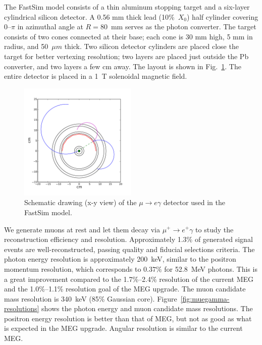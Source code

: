 The FastSim model consists of a thin aluminum stopping target and a six-layer
cylindrical silicon detector. A 0.56 mm thick lead (10\%~$X_0$) half cylinder
covering 0--$\pi$ in azimuthal angle at $R=80$~mm serves as the photon converter. 
The target consists of two cones connected at their base; each cone is 30 mm 
high, 5 mm in radius, and 50~$\mu m$ thick.
Two silicon detector cylinders are placed close the target for better vertexing resolution;
two layers are placed just outside the Pb converter, and two layers a few cm away. The layout is shown in
Fig.~\ref{fig:muegamma-scheme}. The entire detector is placed in a 1~T
solenoidal magnetic field. 

\begin{figure}[htbp]
   \centering
   \includegraphics[width=0.5\textwidth]{ChargedLeptons/Figures/muegamma-schematic.pdf} 
   \caption{Schematic drawing (x-y view) of the $\mu\to e\gamma$ detector used in the 
   FastSim model. }
   \label{fig:muegamma-scheme}
\end{figure}

We generate muons at rest and let them decay via $\mu^+\to e^+\gamma$ to study
the reconstruction efficiency and resolution. Approximately 1.3\% of generated
signal events are well-reconstructed, passing quality and fiducial selections criteria.
The photon energy resolution is approximately 200~keV, similar to the positron momentum
resolution, which corresponds to $0.37\%$ for 52.8~MeV photons. This is a great
improvement compared to the 1.7\%--2.4\% resolution of the current MEG and the  1.0\%--1.1\% resolution goal of the MEG
upgrade. The muon candidate mass resolution is 340~keV (85\% Gaussian core).
Figure~\ref{fig:muegamma-resolutions} shows the photon energy and muon candidate 
mass resolutions. The positron energy resolution is better than that of MEG, but not
as good as what is expected in the MEG upgrade. Angular resolution is similar to  the
current MEG.

